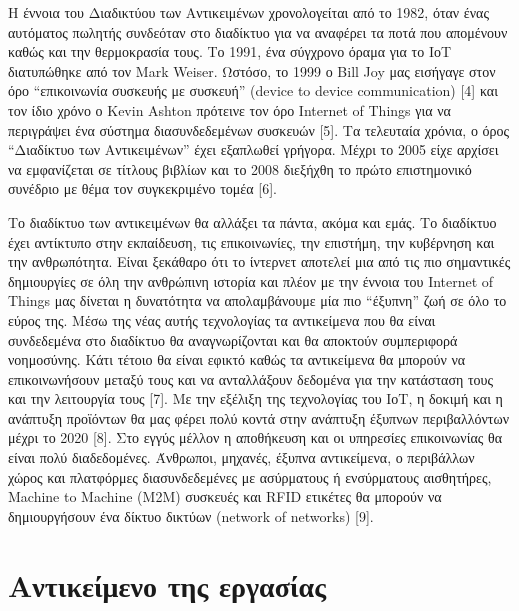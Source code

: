Η έννοια του Διαδικτύου των Αντικειμένων χρονολογείται από το 1982, όταν ένας αυτόματος πωλητής συνδεόταν στο διαδίκτυο για να αναφέρει τα ποτά που απομένουν καθώς και την θερμοκρασία τους. Το 1991, ένα σύγχρονο όραμα για το ΙοΤ διατυπώθηκε από τον Mark Weiser. Ωστόσο, το 1999 ο Bill Joy μας εισήγαγε στον όρο “επικοινωνία συσκευής με συσκευή” (device to device communication) [4] και τον ίδιο χρόνο ο Kevin Ashton πρότεινε τον όρο Internet of Things για να περιγράψει ένα σύστημα διασυνδεδεμένων συσκευών [5]. Τα τελευταία χρόνια, ο όρος “Διαδίκτυο των Αντικειμένων” έχει εξαπλωθεί γρήγορα. Μέχρι το 2005 εί­χε αρχίσει να εμφανίζεται σε τίτλους βιβλίων και το 2008 διεξήχθη το πρώτο επιστημονικό συνέδριο με θέμα τον συγκεκριμένο τομέα [6]. 

Το διαδίκτυο των αντικειμένων θα αλλάξει τα πάντα, ακόμα και εμάς. Το διαδίκτυο έχει αντίκτυπο στην εκπαίδευση, τις επικοινωνίες, την επιστήμη, την κυβέρνηση και την ανθρωπότητα. Είναι ξεκάθαρο ότι το ίντερνετ αποτελεί μια από τις πιο σημαντικές δημιουργίες σε όλη την αν­θρώπινη ιστορία και πλέον με την έννοια του Internet of Things μας δίνε­ται η δυνατότητα να απολαμβάνουμε μία πιο “έξυπνη” ζωή σε όλο το εύ­ρος της. Μέσω της νέας αυτής τεχνολογίας τα αντικείμενα που θα είναι συνδεδεμένα στο διαδίκτυο θα αναγνωρίζονται και θα αποκτούν συμπερι­φορά νοημοσύνης. Κάτι τέτοιο θα είναι εφικτό καθώς τα αντικείμενα θα μπορούν να επικοινωνήσουν μεταξύ τους και να ανταλλάξουν δεδομένα για την κατάσταση τους και την λειτουργία τους [7]. 
Με την εξέλιξη της τεχνολογίας του ΙοΤ, η δοκιμή και η ανάπτυξη προϊόντων θα μας φέρει πολύ κοντά στην ανάπτυξη έξυπνων περιβαλλόντων μέχρι το 2020 [8]. Στο εγγύς μέλλον η αποθήκευση και οι υπηρεσίες επικοινωνίας θα είναι πολύ διαδεδομένες. Άνθρωποι, μηχανές, έξυ­πνα αντικείμενα, ο περιβάλλων χώρος και πλατφόρμες διασυνδεδεμένες με ασύρματους ή ενσύρματους αισθητήρες, Machine to Machine (M2M) συσκευές και RFID ετικέτες θα μπορούν να δημιουργήσουν ένα δίκτυο δικτύων (network of networks) [9]. 


\section{Αντικείμενο της εργασίας}

